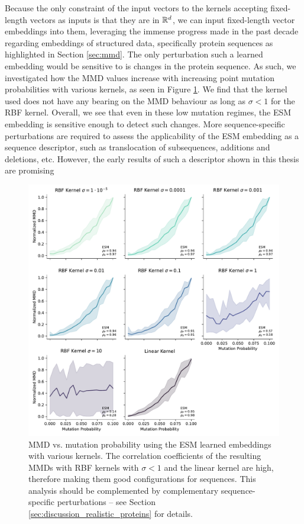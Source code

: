 Because the only constraint of the input vectors to the kernels accepting
fixed-length vectors as inputs is that they are in $\mathbb{R}^d$, we can input
fixed-length vector embeddings into them, leveraging the immense progress made
in the past decade regarding embeddings of structured data, specifically protein
sequences as highlighted in Section \ref{sec:mmd}. The only perturbation such a
learned embedding would be sensitive to is changes in the protein sequence. As
such, we investigated how the MMD values increase with increasing point mutation
probabilities with various kernels, as seen in Figure \ref{fig:esm_descriptor}.
We find that the kernel used does not have any bearing on the MMD behaviour as
long as $\sigma<1$ for the RBF kernel. Overall, we see that even in these low
mutation regimes, the ESM embedding is sensitive enough to detect such changes.
More sequence-specific perturbations are required to assess the
applicability of the ESM embedding as a sequence descriptor, such as
translocation of subsequences, additions and deletions, etc. However, the early
results of such a descriptor shown in this thesis are promising

\begin{figure}
  \centering
  \includegraphics[width=\textwidth]{./figures/results/res_5.pdf}
  \caption[MMD using ESM embeddings.]{MMD vs. mutation probability using the ESM
learned embeddings with various kernels. The correlation coefficients of the
resulting MMDs with RBF kernels with $\sigma<1$ and the linear kernel are high,
therefore making them good configurations for sequences. This analysis should be
complemented by complementary sequence-specific perturbations -- see Section
\ref{sec:discussion_realistic_proteins} for details.}
  \label{fig:esm_descriptor}
\end{figure}


